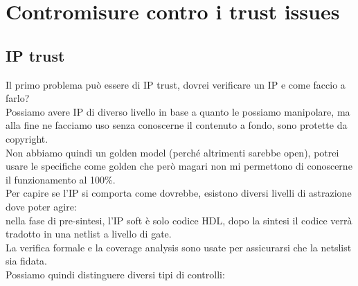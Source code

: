 \documentclass[oneside, 12pt]{extbook}
\begin{document}
\section{Contromisure contro i trust issues}
\subsection{IP trust}
Il primo problema può essere di IP trust, dovrei verificare un IP e come faccio a farlo?
\\Possiamo avere IP di diverso livello in base a quanto le possiamo manipolare, ma alla fine ne facciamo uso senza conoscerne il contenuto a fondo, sono protette da copyright.
\\Non abbiamo quindi un golden model (perché altrimenti sarebbe open), potrei usare le specifiche come golden che però magari non mi permettono di conoscerne il funzionamento al 100\%.
\\Per capire se l'IP si comporta come dovrebbe, esistono diversi livelli di astrazione dove poter agire:
\\nella fase di pre-sintesi, l'IP soft è solo codice HDL, dopo la sintesi il codice verrà tradotto in una netlist a livello di gate.
\\La verifica formale e la coverage analysis sono usate per assicurarsi che la netslist sia fidata.
\\Possiamo quindi distinguere diversi tipi di controlli:
\end{document}
